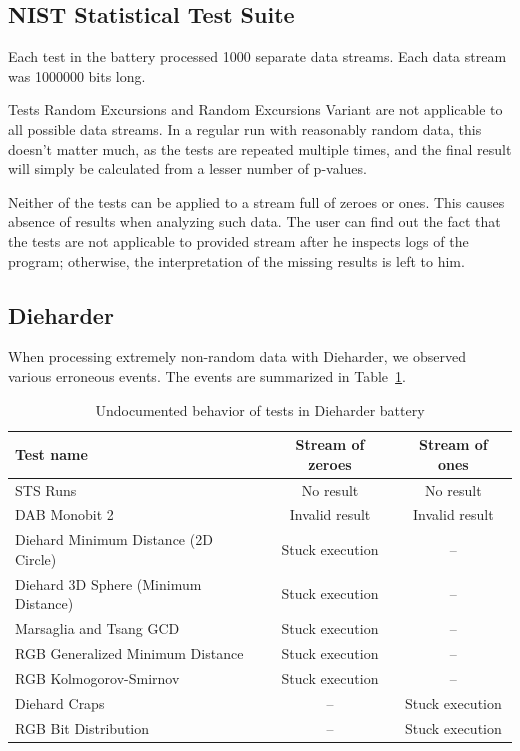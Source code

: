 \documentclass[
  digital,  	%
  color,		%
  oneside,   	%
  12pt,
  nocover,
  notable,
  nolof,
  nolot,
]{fithesis3}
\theoremstyle{definition}
\theoremstyle{remark}
\begin{document}
\subsection*{NIST Statistical Test Suite}
Each test in the battery processed 1000 separate data streams. Each data stream was 1000000 bits long.

Tests Random Excursions and Random Excursions Variant are not applicable to all possible data streams. In a regular run with reasonably random data, this doesn't matter much, as the tests are repeated multiple times, and the final result will simply be calculated from a lesser number of p-values. 

Neither of the tests can be applied to a stream full of zeroes or ones. This causes absence of results when analyzing such data. The user can find out the fact that the tests are not applicable to provided stream after he inspects logs of the program; otherwise, the interpretation of the missing results is left to him.

\subsection*{Dieharder}
When processing extremely non-random data with Dieharder, we observed various erroneous events. The events are summarized in Table~\ref{tab:dieharder_errors}. 

\begin{table}[h!]
\begin{nomar}
\centering
\begin{tabular}{@{}lcc@{}} \toprule
\textbf{Test name}                   & \textbf{Stream of zeroes} & \textbf{Stream of ones} \\ \midrule
STS Runs                             & No result                & No result                \\
DAB Monobit 2 						 & Invalid result           & Invalid result           \\
Diehard Minimum Distance (2D Circle) & Stuck execution          & --                        \\
Diehard 3D Sphere (Minimum Distance) & Stuck execution          & --                        \\
Marsaglia and Tsang GCD              & Stuck execution          & --                        \\
RGB Generalized Minimum Distance     & Stuck execution          & --                        \\
RGB Kolmogorov-Smirnov               & Stuck execution          & --                        \\  
Diehard Craps                        & --                       & Stuck execution          \\
RGB Bit Distribution                 & --                       & Stuck execution          \\ \bottomrule
\end{tabular}
\end{nomar}
\caption{Undocumented behavior of tests in Dieharder battery}
\label{tab:dieharder_errors}
\end{table}
\end{document}
